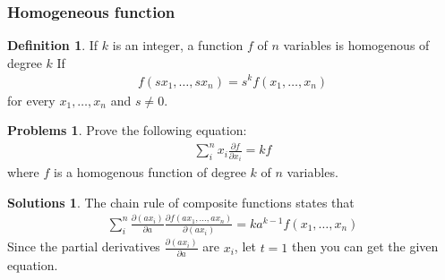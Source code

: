 \documentclass[draft]{article}
\theoremstyle{definition}
\newtheorem{definition}{Definition}[section]
\newtheorem{problem}{Problems}[section]
\newtheorem{solution}{Solutions}[section]
\newcommand{\pardif}[2]{\frac{\partial #1}{\partial #2}}
\begin{document}
\subsubsection{Homogeneous function}

\begin{definition}
    If $k$ is an integer, a function $f$ of $n$ variables is homogenous of degree $k$ If
    \begin{align}
        f(sx_1, \ldots, sx_n) = s^kf(x_1, \ldots, x_n)
    \end{align}
    for every $x_1, \ldots, x_n$ and $s\neq0$.
\end{definition}
\begin{problem}
    Prove the following equation:
    \begin{align}
        \sum_i^nx_i\pardif{f}{x_i}=kf
    \end{align}
    where $f$ is a homogenous function of degree $k$ of $n$ variables.
\end{problem}
\begin{solution}
    The chain rule of composite functions states that
    \begin{align}
        \sum_i^n\pardif{(ax_i)}{a}\pardif{f(ax_1,\ldots,ax_n)}{(ax_i)}=ka^{k-1}f(x_1,\ldots,x_n)
    \end{align}
    Since the partial derivatives $\pardif{(ax_i)}{a}$ are $x_i$, let $t=1$ then you can get the given equation.
\end{solution}
\end{document}
